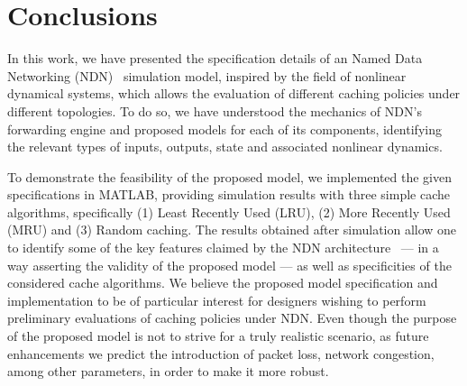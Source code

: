 \section{Conclusions}
\label{sec:conclusions}

In this work, we have presented the specification details of an Named Data 
Networking (NDN)~\cite{Jacobson2009} simulation model, inspired by the field of nonlinear dynamical systems, which 
allows the evaluation of different caching policies under different topologies. To 
do so, we have understood the mechanics of NDN's forwarding engine and proposed 
models for each of its components, identifying the relevant types of inputs, 
outputs, state and associated nonlinear dynamics.\shortvertbreak

To demonstrate the feasibility of the proposed model, we implemented the 
given specifications in MATLAB\textsuperscript{\textregistered}, providing 
simulation results with three simple cache algorithms, specifically (1) Least Recently 
Used (LRU), (2) More Recently Used (MRU) and (3) Random caching. The results 
obtained after simulation allow one to identify some of the key features claimed 
by the NDN architecture~\cite{Jacobson2009} --- in a way asserting the validity 
of the proposed model --- as well as specificities of 
the considered cache algorithms. We believe the proposed model specification 
and implementation to be of particular interest for designers wishing to 
perform preliminary evaluations of caching policies under NDN. Even though the 
purpose of the proposed model is not to strive for a truly realistic 
scenario, as future enhancements we predict the introduction of packet loss, 
network congestion, among other parameters, in order to make it more robust.
